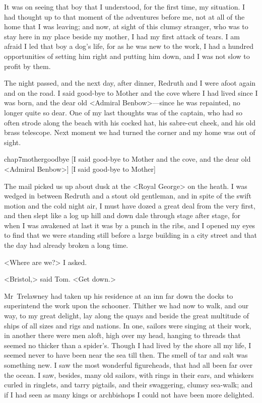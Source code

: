 It was on seeing that boy that I understood, for the first time, my situation. I had thought up to that moment of the adventures before me, not at all of the home that I was leaving; and now, at sight of this clumsy stranger, who was to stay here in my place beside my mother, I had my first attack of tears. I am afraid I led that boy a dog's life, for as he was new to the work, I had a hundred opportunities of setting him right and putting him down, and I was not slow to profit by them.

 

The night passed, and the next day, after dinner, Redruth and I were afoot again and on the road. I said good-bye to Mother and the cove where I had lived since I was born, and the dear old <Admiral Benbow>—since he was repainted, no longer quite so dear. One of my last thoughts was of the captain, who had so often strode along the beach with his cocked hat, his sabre-cut cheek, and his old brass telescope. Next moment we had turned the corner and my home was out of sight.

\begin{bwbigpic}
	[\basicscale]
	{chap7mothergoodbye}
	[I said good-bye to Mother and the cove, and the dear old <Admiral Benbow>]
	[I said good-bye to Mother]
\end{bwbigpic}


The mail picked us up about dusk at the <Royal George> on the heath. I was wedged in between Redruth and a stout old gentleman, and in spite of the swift motion and the cold night air, I must have dozed a great deal from the very first, and then slept like a log up hill and down dale through stage after stage, for when I was awakened at last it was by a punch in the ribs, and I opened my eyes to find that we were standing still before a large building in a city street and that the day had already broken a long time.

<Where are we?> I asked.

<Bristol,> said Tom. <Get down.>

Mr~Trelawney had taken up his residence at an inn far down the docks to superintend the work upon the schooner. Thither we had now to walk, and our way, to my great delight, lay along the quays and beside the great multitude of ships of all sizes and rigs and nations. In one, sailors were singing at their work, in another there were men aloft, high over my head, hanging to threads that seemed no thicker than a spider's. Though I had lived by the shore all my life, I seemed never to have been near the sea till then. The smell of tar and salt was something new. I saw the most wonderful figureheads, that had all been far over the ocean. I saw, besides, many old sailors, with rings in their ears, and whiskers curled in ringlets, and tarry pigtails, and their swaggering, clumsy sea-walk; and if I had seen as many kings or archbishops I could not have been more delighted.


